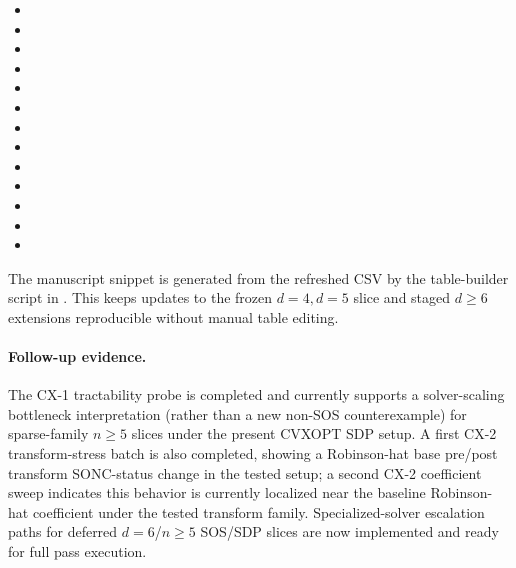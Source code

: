 \documentclass{article}
\begin{document}
\begin{itemize}
    \item {}
    \item {}
    \item {}
    \item {}
    \item {}
    \item {}
    \item {}
    \item {}
    \item {}
    \item {}
    \item {}
    \item {}
    \item {}
\end{itemize}
The manuscript snippet  is generated
from the refreshed CSV by the table-builder script in .
This keeps updates to the frozen $d=4,d=5$ slice and staged $d \geq 6$
extensions reproducible without manual table editing.

\paragraph{Follow-up evidence.}
The CX-1 tractability probe is completed and currently supports a solver-scaling bottleneck
interpretation (rather than a new non-SOS counterexample) for sparse-family $n\geq 5$ slices
under the present CVXOPT SDP setup. A first CX-2 transform-stress batch is also completed,
showing a Robinson-hat base pre/post transform SONC-status change in the tested setup;
a second CX-2 coefficient sweep indicates this behavior is currently localized near the
baseline Robinson-hat coefficient under the tested transform family. Specialized-solver
escalation paths for deferred $d=6$/$n\geq 5$ SOS/SDP slices are now implemented and
ready for full pass execution.
\end{document}
